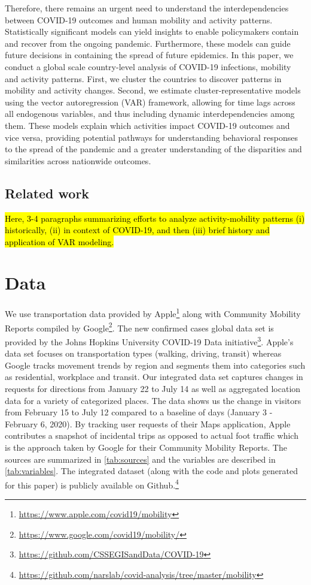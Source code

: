 \documentclass[preprint, 12pt]{elsarticle}
\newcommand{\?}{\stackrel{?}{=}}
\begin{document}
Therefore, there remains an urgent need to understand the interdependencies between COVID-19 outcomes and human mobility and activity patterns.
Statistically significant models can yield insights to enable policymakers contain and recover from the ongoing pandemic.
Furthermore, these models can guide future decisions in containing the spread of future epidemics.
In this paper, we conduct a global scale country-level analysis of COVID-19 infections,  mobility and activity patterns.
First, we cluster the countries to discover patterns in mobility and activity changes.
Second, we estimate cluster-representative models using the vector autoregression (VAR) framework, allowing for time lags across all endogenous variables, and thus including dynamic interdependencies among them.
These models explain which activities impact COVID-19 outcomes and vice versa, providing potential pathways for understanding behavioral responses to the spread of the pandemic and a greater understanding of the disparities and similarities across nationwide outcomes.

 
\subsection{Related work}
\hl{Here, 3-4 paragraphs summarizing efforts to analyze activity-mobility patterns (i) historically, (ii) in context of COVID-19, and then (iii) brief history and application of VAR modeling.} 

\section{Data}
We use transportation data provided by Apple\footnote{\url{https://www.apple.com/covid19/mobility}} along with Community Mobility Reports compiled by Google\footnote{\url{https://www.google.com/covid19/mobility/}}. %
The new confirmed cases global data set is provided by the Johns Hopkins University COVID-19 Data initiative\footnote{\url{https://github.com/CSSEGISandData/COVID-19}}.
Apple's data set focuses on transportation types (walking, driving, transit) whereas Google tracks movement trends by region and segments them into categories such as residential, workplace and transit. Our integrated data set captures changes in requests for directions from January 22 to July 14 as well as aggregated location data for a variety of categorized places. The data shows us the change in visitors from February 15 to July 12 compared to a baseline of days (January 3 - February 6, 2020). By tracking user requests of their Maps application, Apple contributes a snapshot of incidental trips as opposed to actual foot traffic which is the approach taken by Google for their Community Mobility Reports. 
The sources are summarized in \autoref{tab:sources} and the variables are described in \autoref{tab:variables}.
The integrated dataset (along with the code and plots generated for this paper) is publicly available on Github.\footnote{\url{https://github.com/narslab/covid-analysis/tree/master/mobility}}
\end{document}
